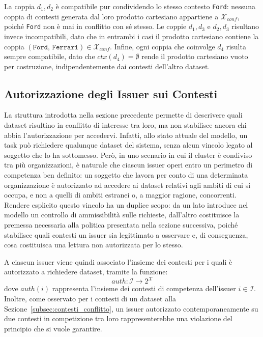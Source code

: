 La coppia $d_1, d_2$ è compatibile pur condividendo lo stesso contesto \texttt{Ford}: nessuna coppia di contesti generata dal loro prodotto cartesiano appartiene a $\mathcal{X}_{conf}$, poiché \texttt{Ford} non è mai in conflitto con sé stesso. Le coppie $d_1, d_3$ e $d_2, d_3$ risultano invece incompatibili, dato che in entrambi i casi il prodotto cartesiano contiene la coppia $(\mathtt{Ford},\, \mathtt{Ferrari}) \in \mathcal{X}_{conf}$. Infine, ogni coppia che coinvolge $d_4$ risulta sempre compatibile, dato che $ctx(d_4) = \emptyset$ rende il prodotto cartesiano vuoto per costruzione, indipendentemente dai contesti dell'altro dataset.


\subsection{Autorizzazione degli Issuer sui Contesti}
\label{subsec:autorizzazione_issuer}

La struttura introdotta nella sezione precedente permette di descrivere quali dataset risultino in conflitto di interesse tra loro, ma non stabilisce ancora chi abbia l'autorizzazione per accedervi. Infatti, allo stato attuale del modello, un task può richiedere qualunque dataset del sistema, senza alcun vincolo legato al soggetto che lo ha sottomesso. Però, in uno scenario in cui il cluster è condiviso tra più organizzazioni, è naturale che ciascun issuer operi entro un perimetro di competenza ben definito: un soggetto che lavora per conto di una determinata organizzazione è autorizzato ad accedere ai dataset relativi agli ambiti di cui si occupa, e non a quelli di ambiti estranei o, a maggior ragione, concorrenti. Rendere esplicito questo vincolo ha un duplice scopo: da un lato introduce nel modello un controllo di ammissibilità sulle richieste, dall'altro costituisce la premessa necessaria alla politica presentata nella sezione successiva, poiché stabilisce quali contesti un issuer sia legittimato a osservare e, di conseguenza, cosa costituisca una lettura non autorizzata per lo stesso.

A ciascun issuer viene quindi associato l'insieme dei contesti per i quali è autorizzato a richiedere dataset, tramite la funzione:
\begin{equation}
    auth: \mathcal{I} \rightarrow 2^{\mathcal{X}}
\end{equation}
dove $auth(i)$ rappresenta l'insieme dei contesti di competenza dell'issuer $i \in \mathcal{I}$. Inoltre, come osservato per i contesti di un dataset alla Sezione~\ref{subsec:contesti_conflitto}, un issuer autorizzato contemporaneamente su due contesti in competizione tra loro rappresenterebbe una violazione del principio che si vuole garantire.

